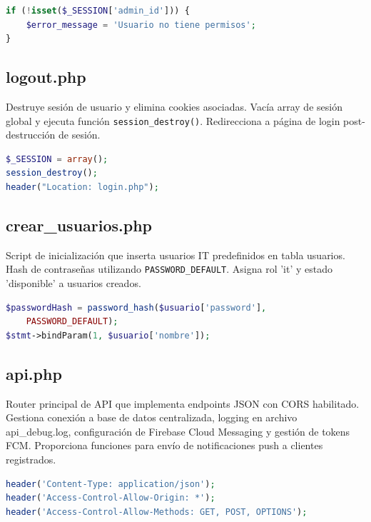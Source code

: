 \documentclass[12pt,a4paper]{article}
\begin{document}
\begin{lstlisting}[language=PHP,caption={Verificación admin}]
if (!isset($_SESSION['admin_id'])) {
    $error_message = 'Usuario no tiene permisos';
}
\end{lstlisting}

\subsection{logout.php}

Destruye sesión de usuario y elimina cookies asociadas. Vacía array de sesión global y ejecuta función \texttt{session\_destroy()}. Redirecciona a página de login post-destrucción de sesión.

\begin{lstlisting}[language=PHP,caption={Destrucción de sesión}]
$_SESSION = array();
session_destroy();
header("Location: login.php");
\end{lstlisting}

\subsection{crear\_usuarios.php}

Script de inicialización que inserta usuarios IT predefinidos en tabla usuarios. Hash de contraseñas utilizando \texttt{PASSWORD\_DEFAULT}. Asigna rol 'it' y estado 'disponible' a usuarios creados.

\begin{lstlisting}[language=PHP,caption={Creación de usuarios}]
$passwordHash = password_hash($usuario['password'], 
    PASSWORD_DEFAULT);
$stmt->bindParam(1, $usuario['nombre']);
\end{lstlisting}

\subsection{api.php}

Router principal de API que implementa endpoints JSON con CORS habilitado. Gestiona conexión a base de datos centralizada, logging en archivo api\_debug.log, configuración de Firebase Cloud Messaging y gestión de tokens FCM. Proporciona funciones para envío de notificaciones push a clientes registrados.

\begin{lstlisting}[language=PHP,caption={Configuración CORS}]
header('Content-Type: application/json');
header('Access-Control-Allow-Origin: *');
header('Access-Control-Allow-Methods: GET, POST, OPTIONS');
\end{lstlisting}
\end{document}
